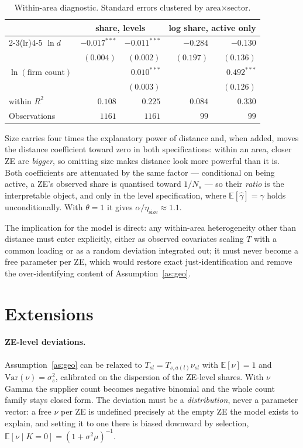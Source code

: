\documentclass[11pt]{article}
\newcommand{\E}{\mathbb{E}}
\begin{document}
\begin{table}[htbp]
\centering
\small
\begin{tabular}{@{}lrrrr@{}}
\toprule
& \multicolumn{2}{c}{share, levels} & \multicolumn{2}{c}{log share, active only}\\
\cmidrule(lr){2-3}\cmidrule(lr){4-5}
$\ln d$ & $-0.017^{***}$ & $-0.011^{***}$ & $-0.284$ & $-0.130$\\
        & $(0.004)$ & $(0.002)$ & $(0.197)$ & $(0.136)$\\
$\ln(\text{firm count})$ & & $0.010^{***}$ & & $0.492^{***}$\\
        & & $(0.003)$ & & $(0.126)$\\
\midrule
within $R^{2}$ & $0.108$ & $0.225$ & $0.084$ & $0.330$\\
Observations & $1161$ & $1161$ & $99$ & $99$\\
\bottomrule
\end{tabular}
\caption{Within-area diagnostic. Standard errors clustered by area$\times$sector.}
\label{tab:diagnostic}
\end{table}

Size carries four times the explanatory power of distance and, when added, moves the distance
coefficient toward zero in both specifications: within an area, closer ZE are \emph{bigger}, so
omitting size makes distance look more powerful than it is. Both coefficients are attenuated by
the same factor --- conditional on being active, a ZE's observed share is quantised toward $1/N_{s}$
--- so their \emph{ratio} is the interpretable object, and only in the level specification, where
$\E[\hat\gamma]=\gamma$ holds unconditionally. With $\theta=1$ it gives
$\alpha/\eta_{\text{size}}\approx1.1$.

The implication for the model is direct: any within-area heterogeneity other than distance must
enter explicitly, either as observed covariates scaling $T$ with a common loading or as a random
deviation integrated out; it must never become a free parameter per ZE, which would restore exact
just-identification and remove the over-identifying content of Assumption~\ref{as:geo}.

\section{Extensions}

\paragraph{ZE-level deviations.} Assumption~\ref{as:geo} can be relaxed to
$T_{sl}=T_{s,a(l)}\nu_{sl}$ with $\E[\nu]=1$ and $\mathrm{Var}(\nu)=\sigma^{2}_{s}$, calibrated on
the dispersion of the ZE-level shares. With $\nu$ Gamma the supplier count becomes negative
binomial and the whole count family stays closed form. The deviation must be a \emph{distribution},
never a parameter vector: a free $\nu$ per ZE is undefined precisely at the empty ZE the model
exists to explain, and setting it to one there is biased downward by selection,
$\E[\nu\mid K=0]=(1+\sigma^{2}\mu)^{-1}$.
\end{document}
